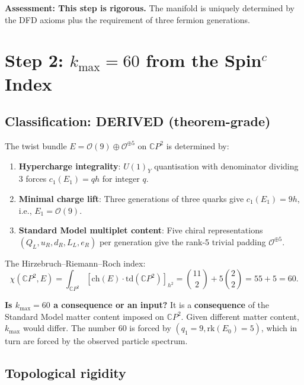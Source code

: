 \documentclass[11pt,a4paper]{article}
\newcommand{\CP}{\mathbb{C}P}
\begin{document}
\textbf{Assessment: This step is rigorous.} The manifold is uniquely
determined by the DFD axioms plus the requirement of three fermion
generations.

\section{Step 2: $k_{\max} = 60$ from the Spin$^c$ Index}
\label{sec:step2}

\subsection{Classification: DERIVED (theorem-grade)}

The twist bundle $E = \mathcal{O}(9) \oplus \mathcal{O}^{\oplus 5}$
on $\CP^2$ is determined by:
\begin{enumerate}[label=(\alph*)]
\item \textbf{Hypercharge integrality}: $U(1)_Y$ quantisation with
  denominator dividing 3 forces $c_1(E_1) = qh$ for integer $q$.
\item \textbf{Minimal charge lift}: Three generations of three quarks
  give $c_1(E_1) = 9h$, i.e., $E_1 = \mathcal{O}(9)$.
\item \textbf{Standard Model multiplet content}: Five chiral
  representations $(Q_L, u_R, d_R, L_L, e_R)$ per generation give the
  rank-5 trivial padding $\mathcal{O}^{\oplus 5}$.
\end{enumerate}

The Hirzebruch--Riemann--Roch index:
\begin{equation}
\chi(\CP^2, E) = \int_{\CP^2}[\mathrm{ch}(E)\cdot\mathrm{td}(\CP^2)]_{h^2}
= \binom{11}{2} + 5\binom{2}{2} = 55 + 5 = 60.
\end{equation}

\textbf{Is $k_{\max} = 60$ a consequence or an input?} It is a
\textbf{consequence} of the Standard Model matter content imposed on
$\CP^2$. Given different matter content, $k_{\max}$ would differ.
The number 60 is forced by $(q_1 = 9, \mathrm{rk}(E_0) = 5)$, which
in turn are forced by the observed particle spectrum.

\subsection{Topological rigidity}
\end{document}

